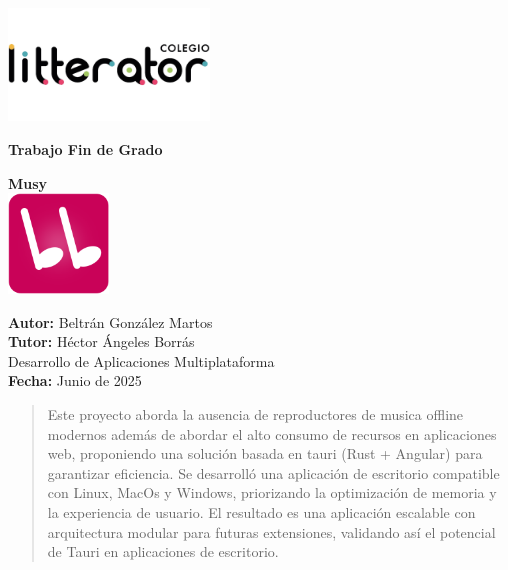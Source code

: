 \documentclass[11pt, a4paper]{article}
\begin{document}
\begin{titlepage}
    \centering

    \includegraphics[width=0.4\textwidth]{media/logo-litterator.png}

    \fontsize{26pt}{24pt}\selectfont \textbf{Trabajo Fin de Grado} \\
    \vspace{4.5cm}
    
    \fontsize{24pt}{24pt}\selectfont \textbf{Musy} \\
    \vspace{0.5cm}
    \includegraphics[width=0.2\textwidth]{media/Square310x310Logo.png} \\
    \vspace{2cm}

    \hfill
    \begin{minipage}{0.8\textwidth}
        \raggedleft
        \large
        \begin{spacing}{1.5}
            \textbf{Autor:} Beltrán González Martos \\
            \textbf{Tutor:} Héctor Ángeles Borrás \\
            Desarrollo de Aplicaciones Multiplataforma \\
            \textbf{Fecha:} Junio de 2025
        \end{spacing}
    \end{minipage}
\end{titlepage}


\begin{abstract}
    Este proyecto aborda la ausencia de reproductores de musica offline modernos además de abordar el alto consumo de recursos en aplicaciones web, proponiendo una solución basada en tauri (Rust + Angular) para garantizar eficiencia. Se desarrolló una aplicación de escritorio compatible con Linux, MacOs y Windows, priorizando la optimización de memoria y la experiencia de usuario. El resultado es una aplicación escalable con arquitectura modular para futuras extensiones, validando así el potencial de Tauri en aplicaciones de escritorio.
\end{abstract}
\end{document}
